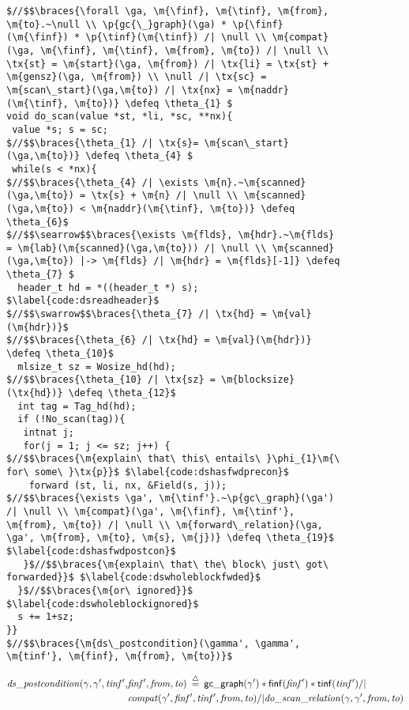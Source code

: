 \renewcommand{\tx}[1]{\scriptsize {\text{#1}}}

\begin{figure}[t]
\vspace{-1ex}
  \begin{lstlisting}[multicols = 2]
$//$$\braces{\forall \ga, \m{\finf}, \m{\tinf}, \m{from}, \m{to}.~\null \\ \p{gc{\_}graph}(\ga) * \p{\finf}(\m{\finf}) * \p{\tinf}(\m{\tinf}) /| \null \\ \m{compat}(\ga, \m{\finf}, \m{\tinf}, \m{from}, \m{to}) /| \null \\ \tx{st} = \m{start}(\ga, \m{from}) /| \tx{li} = \tx{st} + \m{gensz}(\ga, \m{from}) \\ \null /| \tx{sc} = \m{scan\_start}(\ga,\m{to}) /| \tx{nx} = \m{naddr}(\m{\tinf}, \m{to})} \defeq \theta_{1} $
void do_scan(value *st, *li, *sc, **nx){
 value *s; s = sc;
$//$$\braces{\theta_{1} /| \tx{s}= \m{scan\_start}(\ga,\m{to})} \defeq \theta_{4} $
 while(s < *nx){
$//$$\braces{\theta_{4} /| \exists \m{n}.~\m{scanned}(\ga,\m{to}) = \tx{s} + \m{n} /| \null \\ \m{scanned}(\ga,\m{to}) < \m{naddr}(\m{\tinf}, \m{to})} \defeq \theta_{6}$
$//$$\searrow$$\braces{\exists \m{flds}, \m{hdr}.~\m{flds} = \m{lab}(\m{scanned}(\ga,\m{to})) /| \null \\ \m{scanned}(\ga,\m{to}) |-> \m{flds} /| \m{hdr} = \m{flds}[-1]} \defeq \theta_{7} $
  header_t hd = *((header_t *) s); $\label{code:dsreadheader}$
$//$$\swarrow$$\braces{\theta_{7} /| \tx{hd} = \m{val}(\m{hdr})}$
$//$$\braces{\theta_{6} /| \tx{hd} = \m{val}(\m{hdr})} \defeq \theta_{10}$
  mlsize_t sz = Wosize_hd(hd);
$//$$\braces{\theta_{10} /| \tx{sz} = \m{blocksize}(\tx{hd})} \defeq \theta_{12}$
  int tag = Tag_hd(hd);
  if (!No_scan(tag)){
   intnat j;
   for(j = 1; j <= sz; j++) {
$//$$\braces{\m{explain\ that\ this\ entails\ }\phi_{1}\m{\ for\ some\ }\tx{p}}$ $\label{code:dshasfwdprecon}$
    forward (st, li, nx, &Field(s, j)); 
$//$$\braces{\exists \ga', \m{\tinf'}.~\p{gc\_graph}(\ga') /| \null \\ \m{compat}(\ga', \m{\finf}, \m{\tinf'}, \m{from}, \m{to}) /| \null \\ \m{forward\_relation}(\ga, \ga', \m{from}, \m{to}, \m{s}, \m{j})} \defeq \theta_{19}$ $\label{code:dshasfwdpostcon}$
   }$//$$\braces{\m{explain\ that\ the\ block\ just\ got\ forwarded}}$ $\label{code:dswholeblockfwded}$
  }$//$$\braces{\m{or\ ignored}}$ $\label{code:dswholeblockignored}$
  s += 1+sz;
}}
$//$$\braces{\m{ds\_postcondition}(\gamma', \gamma', \m{tinf'}, \m{finf}, \m{from}, \m{to})}$
\end{lstlisting}
\footnotesize{
\vspace{-0.8em}
\begin{equation*}
\begin{split}
\m{ds\_postcondition}(\gamma, \ga', \m{tinf'}, &\m{finf'}, \m{from}, \m{to}) \; \defeq \; 
   \p{gc{\_}graph}(\ga') * \p{\finf}(\m{\finf'}) * \p{\tinf}(\m{\tinf'}) /| \null \\
   &\m{compat}(\ga', \m{\finf'}, \m{\tinf'}, \m{from}, \m{to}) /|
   \m{do\_scan\_relation}(\ga, \ga', \m{from}, \m{to})
\end{split}
\end{equation*}

}
\end{figure}
